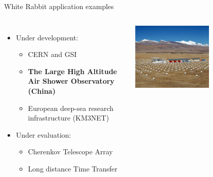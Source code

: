 \documentclass[compress, red]{beamer}
\begin{document}
\begin{frame}{White Rabbit application examples}
\begin{columns}[c]
    \begin{itemize}
      \item Under development:
      \begin{itemize}
	\item CERN and GSI
	\item \textbf{The Large High Altitude Air Shower Observatory (China)}
	\item European deep-sea research infrastructure (KM3NET) 
      \end{itemize}         	
      \item Under evaluation:
      \begin{itemize}
	\item Cherenkov Telescope Array
	\item Long distance Time Transfer
      \end{itemize}         	
    \end{itemize}    
    \begin{center}
      \includegraphics[width=0.6\textwidth]{applications/lhaaso.pdf}
      \end{center}
\end{columns}
\end{frame}
\end{document}
